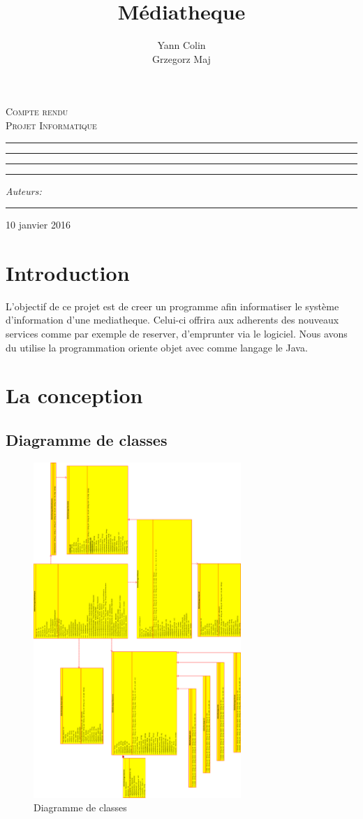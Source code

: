 \documentclass[10pt, a4paper]{article}
\author{Yann Colin \\Grzegorz Maj}
\title{Médiatheque}
\makeatletter
\newcommand{\linia}{\rule{\linewidth}{0.4mm}}
\def\maketitle{%
\begin{titlepage}
	\begin{center}
		\LARGE
		\textsc{Compte rendu \\ Projet Informatique}
	\end{center}

	\vspace{3cm}

	\begin{center}\leavevmode
      \hrule
    \vskip 1pt
	\linia
	\vskip 0.5cm
	\Huge \textsc{\@title}\par

	\vskip 0.5cm
      	\linia
      \vskip 1pt
      \hrule

	\vskip 2mm

	\vspace{1.5cm}
	\begin{flushright}
		\begin{minipage}{5cm}
			\textit{\normalsize Auteurs:}\\
			\Large \textit{\@author} \par
			\vskip 2pt
			\hrule
			
		\end{minipage}
	\end{flushright}
    

	\end{center}%
	\vspace*{\stretch{6}}
    \begin{center}
    10 janvier 2016
    \end{center}
\end{titlepage}
	}
\makeatother
\begin{document}

    \maketitle
    
    \tableofcontents
    \newpage
    
    \section{Introduction}
    
    L'objectif de ce projet est de creer un programme afin informatiser le système d'information d'une
    mediatheque. Celui-ci offrira aux adherents des nouveaux services comme par exemple de reserver,
    d'emprunter via le logiciel. Nous avons du utilise la programmation oriente objet avec comme langage 
    le Java.
    
     
    
     \section{La conception}
     
	     \subsection{Diagramme de classes}
		\begin{figure}[ht]
	    \centering
	    		\includegraphics[width=0.7\textwidth]{graphics/class90.eps}
	    		\caption{Diagramme de classes}
	    		\label{fig:label}
	    	\end{figure}
	    	\newpage
     
\end{document}
